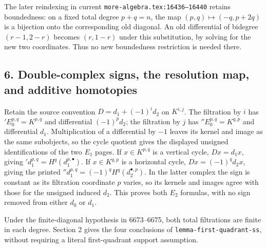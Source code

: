 The later reindexing in current \texttt{more-algebra.tex:16436–16440} retains boundedness: on a fixed total degree \(p+q=n\), the map \((p,q)\mapsto(-q,p+2q)\) is a bijection onto the corresponding old diagonal. An old differential of bidegree \((r-1,2-r)\) becomes \((r,1-r)\) under this substitution, by solving for the new two coordinates. Thus no new boundedness restriction is needed there.

\subsection{6. Double-complex signs, the resolution map, and additive homotopies}\label{note-07-double-complex-signs-the-resolution-map-and-additive-homotopies}

Retain the source convention \(D=d_1+(-1)^i d_2\) on \(K^{i,j}\). The filtration by \(i\) has \({}'E_0^{p,q}=K^{p,q}\) and differential \((-1)^pd_2\); the filtration by \(j\) has \({}''E_0^{p,q}=K^{q,p}\) and differential \(d_1\). Multiplication of a differential by \(-1\) leaves its kernel and image as the same subobjects, so the cycle quotient gives the displayed unsigned identifications of the two \(E_1\) pages. If \(x\in K^{p,q}\) is a vertical cycle, \(Dx=d_1x\), giving \({}'d_1^{p,q}=H^q(d_1^{p,\bullet})\). If \(x\in K^{q,p}\) is a horizontal cycle, \(Dx=(-1)^qd_2x\), giving the printed \({}''d_1^{p,q}=(-1)^qH^q(d_2^{\bullet,p})\). In the latter complex the sign is constant as its filtration coordinate \(p\) varies, so its kernels and images agree with those for the unsigned induced \(d_2\). This proves both \(E_2\) formulas, with no sign removed from either \(d_0\) or \(d_1\).

Under the finite-diagonal hypothesis in 6673--6675, both total filtrations are finite in each degree. Section 2 gives the four conclusions of \texttt{lemma-first-quadrant-ss}, without requiring a literal first-quadrant support assumption.

